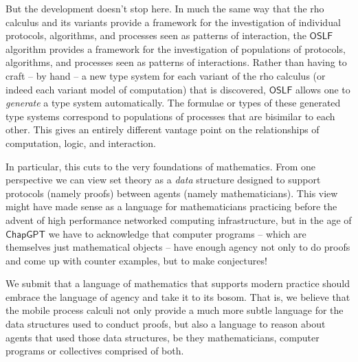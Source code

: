 But the development doesn't stop here. In much the same way that the
rho calculus and its variants provide a framework for the
investigation of individual protocols, algorithms, and processes seen
as patterns of interaction, the $\mathsf{OSLF}$ algorithm provides a
framework for the investigation of populations of protocols,
algorithms, and processes seen as patterns of interactions. Rather
than having to craft -- by hand -- a new type system for each variant
of the rho calculus (or indeed each variant model of computation) that
is discovered, $\mathsf{OSLF}$ allows one to \emph{generate} a type
system automatically. The formulae or types of these generated type
systems correspond to populations of processes that are bisimilar to
each other. This gives an entirely different vantage point on the
relationships of computation, logic, and interaction.

In particular, this cuts to the very foundations of mathematics. From
one perspective we can view set theory as a \emph{data} structure
designed to support protocols (namely proofs) between agents (namely
mathematicians). This view might have made sense as a language for
mathematicians practicing before the advent of high performance
networked computing infrastructure, but in the age of
$\mathsf{ChapGPT}$ we have to acknowledge that computer programs --
which are themselves just mathematical objects -- have enough agency
not only to do proofs and come up with counter examples, but to make
conjectures!

We submit that a language of mathematics that supports modern practice
should embrace the language of agency and take it to its bosom. That
is, we believe that the mobile process calculi not only provide a much
more subtle language for the data structures used to conduct proofs,
but also a language to reason about agents that used those data
structures, be they mathematicians, computer programs or collectives
comprised of both.



